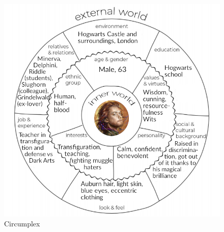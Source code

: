 \begin{figure}[H]
\includegraphics[max width=\textwidth]{../Pictures/Characters/Circumplexes/Albus_circumplex.png} 
\captionsetup{labelformat=empty}
\caption{Circumplex}
\end{figure}

